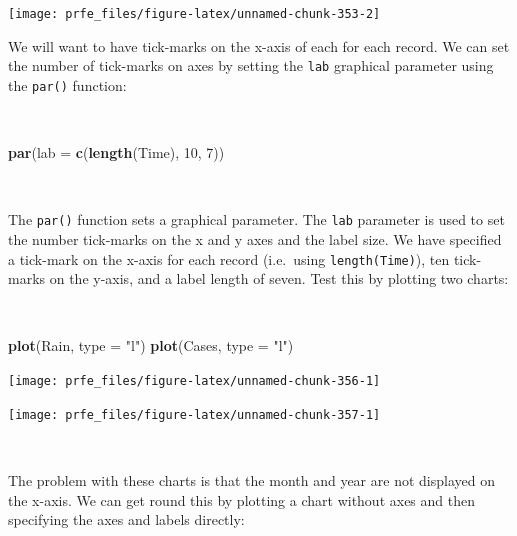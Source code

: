 \documentclass[12pt,a4paper]{book}
\newenvironment{Shaded}{\begin{snugshade}}{\end{snugshade}}
\newcommand{\DataTypeTok}[1]{\textcolor[rgb]{0.13,0.29,0.53}{#1}}
\newcommand{\DecValTok}[1]{\textcolor[rgb]{0.00,0.00,0.81}{#1}}
\newcommand{\KeywordTok}[1]{\textcolor[rgb]{0.13,0.29,0.53}{\textbf{#1}}}
\newcommand{\NormalTok}[1]{#1}
\newcommand{\StringTok}[1]{\textcolor[rgb]{0.31,0.60,0.02}{#1}}
\theoremstyle{definition}
\theoremstyle{definition}
\theoremstyle{definition}
\theoremstyle{remark}
\begin{document}
\begin{center}\texttt{[image: prfe\_files/figure-latex/unnamed-chunk-353-2]} \end{center}

\newpage

We will want to have tick-marks on the x-axis of each for each record.
We can set the number of tick-marks on axes by setting the \texttt{lab}
graphical parameter using the \texttt{par()} function:

~

\begin{Shaded}
\begin{Highlighting}[]
\KeywordTok{par}\NormalTok{(}\DataTypeTok{lab =} \KeywordTok{c}\NormalTok{(}\KeywordTok{length}\NormalTok{(Time), }\DecValTok{10}\NormalTok{, }\DecValTok{7}\NormalTok{))}
\end{Highlighting}
\end{Shaded}

~

The \texttt{par()} function sets a graphical parameter. The \texttt{lab}
parameter is used to set the number tick-marks on the x and y axes and
the label size. We have specified a tick-mark on the x-axis for each
record (i.e.~using \texttt{length(Time)}), ten tick-marks on the y-axis,
and a label length of seven. Test this by plotting two charts:

~

\begin{Shaded}
\begin{Highlighting}[]
\KeywordTok{plot}\NormalTok{(Rain, }\DataTypeTok{type =} \StringTok{"l"}\NormalTok{)}
\KeywordTok{plot}\NormalTok{(Cases, }\DataTypeTok{type =} \StringTok{"l"}\NormalTok{)}
\end{Highlighting}
\end{Shaded}

\begin{center}\texttt{[image: prfe\_files/figure-latex/unnamed-chunk-356-1]} \end{center}

\newpage

\begin{center}\texttt{[image: prfe\_files/figure-latex/unnamed-chunk-357-1]} \end{center}

~

The problem with these charts is that the month and year are not
displayed on the x-axis. We can get round this by plotting a chart
without axes and then specifying the axes and labels directly:
\end{document}
